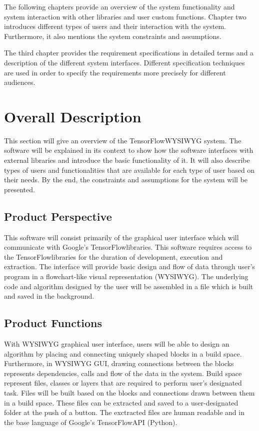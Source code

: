 \documentclass[journal,10pt,onecolumn,compsoc]{IEEEtran} \usepackage[margin=1.0in]{geometry} \usepackage{pdfpages} \usepackage{graphicx}
\begin{document}
The following chapters provide an overview of the system functionality and system interaction with other libraries and user custom functions. 
Chapter two introduces different types of users and their interaction with the system. 
Furthermore, it also mentions the system constraints and assumptions.

The third chapter provides the requirement specifications in detailed terms and a description of the different system interfaces. 
Different specification techniques are used in order to specify the requirements more precisely for different audiences.

\newpage

\section{Overall Description}

This section will give an overview of the TensorFlow\texttrademark WYSIWYG system. 
The software will be explained in its context to show how the software interfaces with external libraries and introduce the basic functionality of it. 
It will also describe types of users  and functionalities that are available for each type of user based on their needs. 
By the end, the constraints and assumptions for the system will be presented.

\subsection{Product Perspective}

This software will consist primarily of the graphical user interface which will communicate with Google's TensorFlow\texttrademark libraries. 
This software requires access to the TensorFlow\texttrademark libraries for the duration of development, execution and extraction. 
The interface will provide basic design and flow of data through user's program in a flowchart-like visual representation (WYSIWYG).
The underlying code and algorithm designed by the user will be assembled in a file which is built and saved in the background. 

\subsection{Product Functions}

With WYSIWYG graphical user interface, users will be able to design an algorithm by placing and connecting uniquely shaped blocks in a build space.
Furthermore, in WYSIWYG GUI, drawing connections between the blocks represents dependencies, calls and flow of the data in the system.
Build space represent files, classes or layers that are required to perform user's designated task.
Files will be built based on the blocks and connections drawn between them in a build space.
These files can be extracted and saved to a user-designated folder at the push of a button.
The exctracted files are human readable and in the base language of Google's TensorFlow\texttrademark API (Python).
\end{document}
